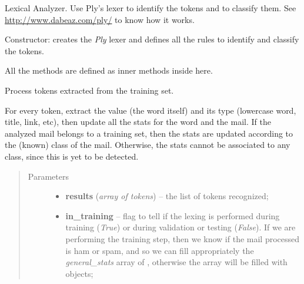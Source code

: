 \documentclass[letterpaper,10pt,english]{sphinxmanual}
\begin{document}
\begin{fulllineitems}
\label{index:lexer.Lexer}
Lexical Analyzer. Use Ply's lexer to identify the tokens and to classify them.
See \href{http://www.dabeaz.com/ply/}{http://www.dabeaz.com/ply/} to know how it works.

\begin{fulllineitems}
\label{index:lexer.Lexer.__init__}
Constructor: creates the \emph{Ply} lexer and defines all the rules to identify
and classify the tokens.

All the  methods are defined as inner methods inside here.

\end{fulllineitems}


\begin{fulllineitems}
\label{index:lexer.Lexer._process_tokens}
Process tokens extracted from the training set.

For every token, extract the value (the word itself)
and its type (lowercase word, title, link, etc),
then update all the stats for the word and the mail.
If the analyzed mail belongs to a training set, then the stats
are updated according to the (known) class of the mail. Otherwise,
the stats cannot be associated to any class, since this is yet to
be detected.
\begin{quote}\begin{description}
\item[{Parameters}] \leavevmode\begin{itemize}
\item {} 
\textbf{results} (\emph{array of tokens}) -- the list of tokens recognized;

\item {} 
\textbf{in\_training} -- flag to tell if the lexing is performed during training            (\emph{True}) or during validation or testing (\emph{False}). If we are performing            the training step, then we know if the mail processed is ham or spam, and
so we can fill appropriately the \emph{general\_stats} array of
{\hyperref[index:gen_stat.Stat]{}}, otherwise the array will be filled with
{\hyperref[index:test_stat.Test_stat]{}} objects;


\end{itemize}
\end{description}
\end{quote}
\end{fulllineitems}
\end{fulllineitems}
\end{document}
